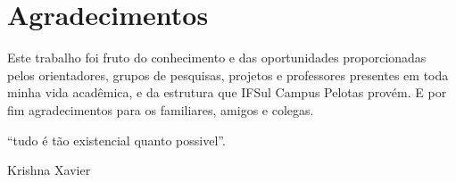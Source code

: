 \chapter*{Agradecimentos}
\vspace*{5cm}
\hfill Este trabalho foi fruto do conhecimento e das oportunidades proporcionadas pelos orientadores, grupos de pesquisas, projetos e professores presentes em toda minha vida acadêmica, e da estrutura que IFSul Campus Pelotas provém. E por fim agradecimentos para os familiares, amigos e colegas.\\


%
\begin{flushright}
\begin{minipage}[r]{10cm}
\vspace{18cm}
``tudo é tão existencial quanto possivel''.
\begin{flushright}
Krishna Xavier
\end{flushright}
\end{minipage}
\end{flushright}
